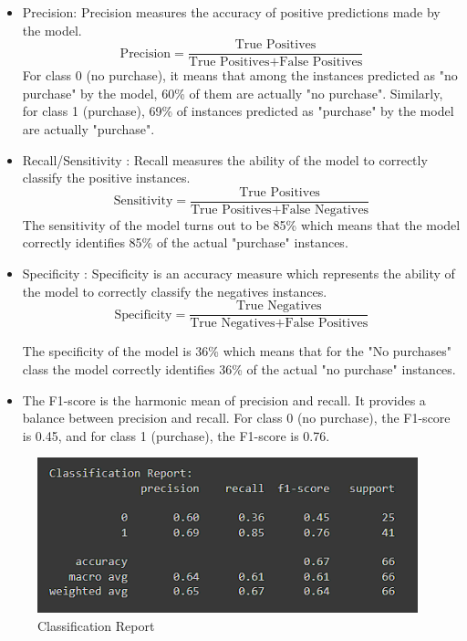 \documentclass[a4paper,10pt]{article}
\begin{document}
\begin{itemize}
    \item 	Precision: Precision measures the accuracy of positive predictions made by the model.
    \begin{equation}
        \text{Precision} = \frac{\text{True Positives}}{\text{True Positives} + \text{False Positives}}
    \end{equation}
    For class 0 (no purchase), it means that among the instances predicted as "no purchase" by the model, 60\% of them are actually "no purchase". Similarly, for class 1 (purchase), 69\% of instances predicted as "purchase" by the model are actually "purchase".
    \vspace{15pt}

    \item Recall/Sensitivity : Recall measures the ability of the model to correctly classify the positive instances.
       \begin{equation}
        \text{Sensitivity} = \frac{\text{True Positives}}{\text{True Positives} + \text{False Negatives}}
    \end{equation}
   The sensitivity of the model turns out to be 85\% which means that the model correctly identifies 85\% of the actual "purchase" instances.
    \vspace{15pt}

    \item Specificity : Specificity is an accuracy measure which represents the ability of the model to correctly classify the negatives instances. 
    \begin{equation}
        \text{Specificity} = \frac{\text{True Negatives}}{\text{True Negatives} + \text{False Positives}}

    \end{equation}
    
The specificity of the model is 36\% which means that for the "No purchases" class the model correctly identifies 36\% of the actual "no purchase" instances.
     \vspace{15pt}
 
    \item The F1-score is the harmonic mean of precision and recall. It provides a balance between precision and recall. For class 0 (no purchase), the F1-score is 0.45, and for class 1 (purchase), the F1-score is 0.76.

\end{itemize}

\begin{figure}[ht]
\centering
\includegraphics[height=4.5cm]{figures/accuracy.png}
\caption{Classification Report} 
\label{accuracy}
\end{figure}
\end{document}
